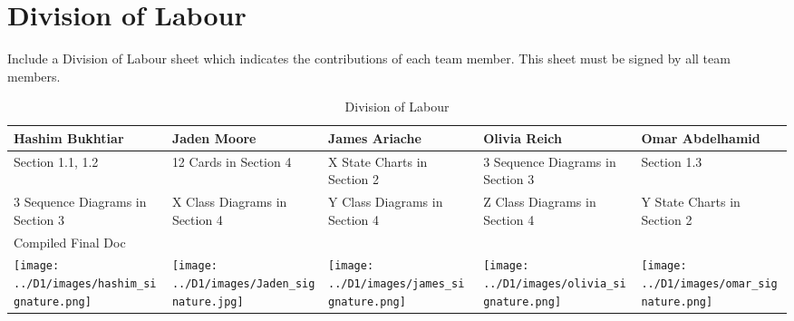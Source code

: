\documentclass[]{article}
\begin{document}
\appendix
\section{Division of Labour}
\label{sec:division_of_labour}
Include a Division of Labour sheet which indicates the contributions of each team member. This sheet must be signed by all team members.

\begin{table}[h!]
\centering
\begin{tabular}{|p{3.5cm}|p{3.5cm}|p{3cm}|p{3.5cm}|p{3cm}|}
\hline
Hashim Bukhtiar & Jaden Moore & James Ariache & Olivia Reich & Omar Abdelhamid \\ \hline
Section 1.1, 1.2 & 12 Cards in Section 4 & X State Charts in Section 2 & 3 Sequence Diagrams in Section 3 & Section 1.3 \\ 
3 Sequence Diagrams in Section 3 & X Class Diagrams in Section 4 & Y Class Diagrams in Section 4 & Z Class Diagrams in Section 4 & Y State Charts in Section 2 \\
Compiled Final Doc &  &  &  & \\

\texttt{[image: ../D1/images/hashim\_signature.png]} & \texttt{[image: ../D1/images/Jaden\_signature.jpg]} &
\texttt{[image: ../D1/images/james\_signature.png]}& \texttt{[image: ../D1/images/olivia\_signature.png]} & \texttt{[image: ../D1/images/omar\_signature.png]}  \\
\hline
\end{tabular}
\caption{Division of Labour} 
\label{tab:division_of_labour}
\end{table}


\newpage
\end{document}
